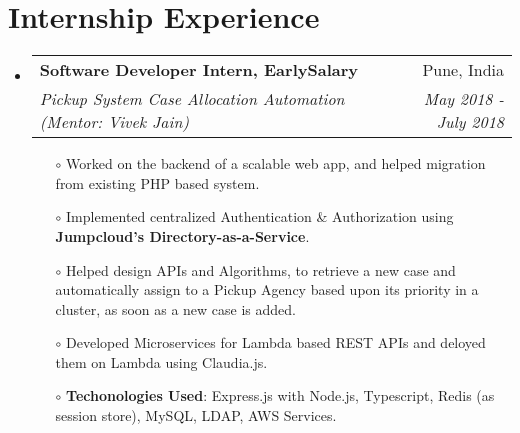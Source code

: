 \documentclass[a4paper,20pt]{article}
\makeatletter
\newcommand{\resumeSubheading}[4]{
	\vspace{-1pt}\item
	\begin{tabular*}{0.97\textwidth}{l@{\extracolsep{\fill}}r}
		\textbf{#1} & #2 \\
		\textit{\small#3} & \textit{\small #4} \\
	\end{tabular*}\vspace{-7pt}
}
\newcommand{\resumeSubHeadingListStart}{\begin{itemize}[leftmargin=*]}
\newcommand{\resumeSubHeadingListEnd}{\end{itemize}}
\makeatother
\begin{document}
\section{Internship Experience}
\resumeSubHeadingListStart

\resumeSubheading
{Software Developer Intern, EarlySalary}{Pune, India}
{Pickup System Case Allocation Automation (Mentor: Vivek Jain)}{May 2018 - July 2018}
\vspace{2pt}
\begin{itemize}
	\item[$\circ$] Worked on the backend of a scalable web app, and helped migration from existing PHP based system.
	\item[$\circ$] Implemented centralized Authentication \& Authorization using \textbf{Jumpcloud’s Directory-as-a-Service}.
	\item[$\circ$] Helped design APIs and Algorithms, to retrieve a new case and automatically assign to a Pickup Agency based upon its priority in a cluster, as soon as a new case is added.
	\item[$\circ$] Developed Microservices for Lambda based REST APIs and deloyed them on Lambda using Claudia.js.
	\item[$\circ$] \textbf{Techonologies Used}: Express.js with Node.js, Typescript, Redis (as session store), MySQL, LDAP, AWS Services.\vspace*{-8pt}
\end{itemize}
\resumeSubHeadingListEnd


\end{document}
